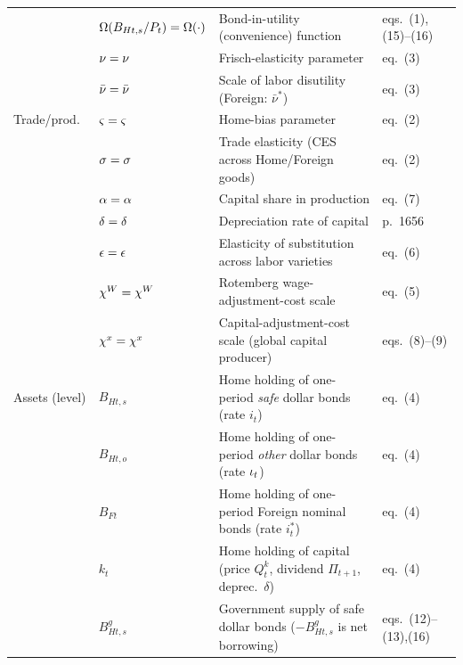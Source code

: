 \begin{longtable}{@{}p{2.55cm} p{2.0cm} p{7.2cm} p{2.4cm}@{}}
                 & $\Omega(B_{Ht,s}/P_t)=\Omega(\cdot)$ & Bond-in-utility (convenience) function                            & eqs.\ (1),(15)--(16) \\
                 & $\nu=\nu$            & Frisch-elasticity parameter                                                     & eq.\ (3) \\
                 & $\bar{\nu}=\bar\nu$        & Scale of labor disutility (Foreign: $\bar\nu^{*}$)                              & eq.\ (3) \\
Trade/prod.\     & $\varsigma=\varsigma$       & Home-bias parameter                                                             & eq.\ (2) \\
                 & $\sigma=\sigma$            & Trade elasticity (CES across Home/Foreign goods)                                & eq.\ (2) \\
                 & $\alpha=\alpha$         & Capital share in production                                                      & eq.\ (7) \\
                 & $\delta=\delta$            & Depreciation rate of capital                                                    & p.\ 1656 \\
                 & $\epsilon=\epsilon$          & Elasticity of substitution across labor varieties                               & eq.\ (6) \\
                 & $\chi^{W}=\chi^{W}$         & Rotemberg wage-adjustment-cost scale                                            & eq.\ (5) \\
                 & $\chi^{x}=\chi^{x}$         & Capital-adjustment-cost scale (global capital producer)                         & eqs.\ (8)--(9) \\
Assets (level)   & $B_{Ht,s}$               & Home holding of one-period \emph{safe} dollar bonds (rate $i_t$)                & eq.\ (4) \\
                 & $B_{Ht,o}$               & Home holding of one-period \emph{other} dollar bonds (rate $\iota_t$)           & eq.\ (4) \\
                 & $B_{Ft}$                 & Home holding of one-period Foreign nominal bonds (rate $i_t^{*}$)               & eq.\ (4) \\
                 & $k_t$                    & Home holding of capital (price $Q^k_t$, dividend $\Pi_{t+1}$, deprec.\ $\delta$)& eq.\ (4) \\
                 & $B^g_{Ht,s}$             & Government supply of safe dollar bonds ($-B^g_{Ht,s}$ is net borrowing)         & eqs.\ (12)--(13),(16) \\

\end{longtable}
